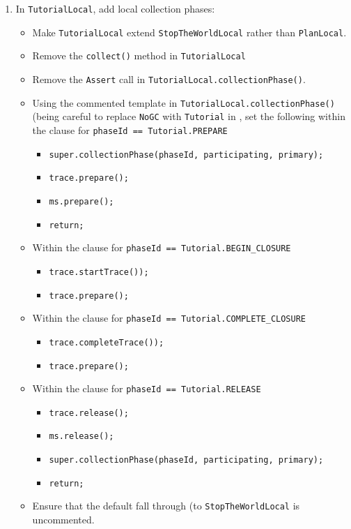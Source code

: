\documentclass{article}
\newcommand{\code}[1]{\texttt{#1}}
\begin{document}
\begin{itemize}
\begin{enumerate}
\begin{enumerate}
        \item In \code{TutorialLocal}, add local collection phases:
        \begin{itemize}
            \item Make \code{TutorialLocal} extend \code{StopTheWorldLocal} rather than \code{PlanLocal}.
            \item Remove the \code{collect()} method in
            \code{TutorialLocal}
            \item Remove the \code{Assert} call in
            \code{TutorialLocal.collectionPhase()}.
            \item Using the commented template in \code{TutorialLocal.collectionPhase()} (being careful to replace \code{NoGC} with \code{Tutorial} in
            , set the following within the clause for
            \code{phaseId == Tutorial.PREPARE}
            \begin{itemize}
                \item[] \code{super.collectionPhase(phaseId, participating, primary);}
                \item[] \code{trace.prepare();}
                \item[] \code{ms.prepare();}
                \item[] \code{return;}
            \end{itemize}
            \item Within the clause for \code{phaseId == Tutorial.BEGIN\_CLOSURE}
            \begin{itemize}
                \item[] \code{trace.startTrace());}
                \item[] \code{trace.prepare();}
            \end{itemize}
            \item Within the clause for \code{phaseId == Tutorial.COMPLETE\_CLOSURE}
            \begin{itemize}
                \item[] \code{trace.completeTrace());}
                \item[] \code{trace.prepare();}
            \end{itemize}
            \item Within the clause for \code{phaseId == Tutorial.RELEASE}
            \begin{itemize}
                \item[] \code{trace.release();}
                \item[] \code{ms.release();}
                \item[] \code{super.collectionPhase(phaseId, participating, primary);}
                \item[] \code{return;}
            \end{itemize}
            \item Ensure that the default fall through (to
            \code{StopTheWorldLocal} is uncommented.
        \end{itemize}


\end{enumerate}
\end{enumerate}
\end{itemize}
\end{document}
